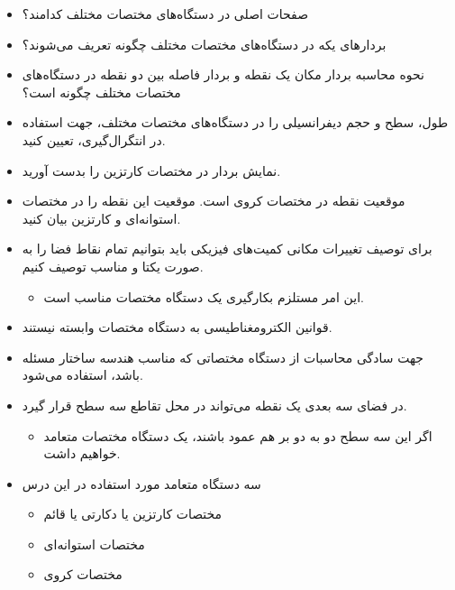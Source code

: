 \begin{ELunit}


\begin{itemize}
\item
  صفحات اصلی در دستگاه‌های مختصات مختلف کدامند؟
\item
  بردارهای یکه در دستگاه‌های مختصات مختلف چگونه تعریف می‌شوند؟
\item
  نحوه محاسبه بردار مکان یک نقطه و بردار فاصله بین دو نقطه در دستگاه‌های مختصات مختلف چگونه است؟
\item
  طول، سطح و حجم دیفرانسیلی را در دستگاه‌های مختصات مختلف، جهت استفاده در انتگرال‌گیری، تعیین کنید.
\item
  نمایش بردار  در مختصات کارتزین را بدست آورید.
\item
  موقعیت نقطه  در مختصات کروی  است. موقعیت این نقطه را در مختصات استوانه‌ای و کارتزین بیان کنید.
\item
  برای توصیف تغییرات مکانی کمیت‌های فیزیکی باید بتوانیم تمام نقاط فضا را به صورت یکتا و مناسب توصیف کنیم.

  \begin{itemize}
  \tightlist
  \item
    این امر مستلزم بکارگیری یک دستگاه مختصات مناسب است.
  \end{itemize}
\item
  قوانین الکترومغناطیسی به دستگاه مختصات وابسته نیستند.
\item
  جهت سادگی محاسبات از دستگاه مختصاتی که مناسب هندسه ساختار مسئله باشد، استفاده می‌شود.
\item
  در فضای سه بعدی یک نقطه می‌تواند در محل تقاطع سه سطح قرار گیرد.

  \begin{itemize}
  \tightlist
  \item
    اگر این سه سطح دو به دو بر هم عمود باشند، یک دستگاه مختصات متعامد خواهیم داشت.
  \end{itemize}
\item
  سه دستگاه متعامد مورد استفاده در این درس

  \begin{itemize}
  \tightlist
  \item
    مختصات کارتزین یا دکارتی یا قائم
  \item
    مختصات استوانه‌ای
  \item
    مختصات کروی
  \end{itemize}
\end{itemize}

\end{ELunit}

